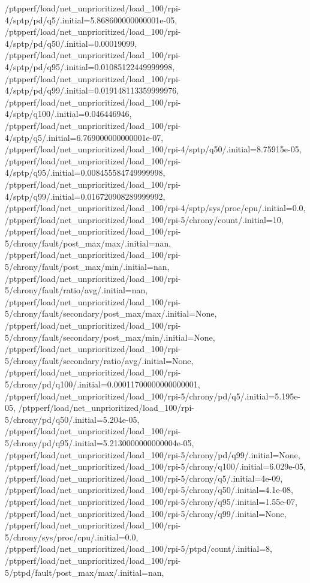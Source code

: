 {    /ptpperf/load/net_unprioritized/load_100/rpi-4/sptp/pd/q5/.initial=5.868600000000001e-05,
    /ptpperf/load/net_unprioritized/load_100/rpi-4/sptp/pd/q50/.initial=0.00019099,
    /ptpperf/load/net_unprioritized/load_100/rpi-4/sptp/pd/q95/.initial=0.01085122449999998,
    /ptpperf/load/net_unprioritized/load_100/rpi-4/sptp/pd/q99/.initial=0.019148113359999976,
    /ptpperf/load/net_unprioritized/load_100/rpi-4/sptp/q100/.initial=0.046446946,
    /ptpperf/load/net_unprioritized/load_100/rpi-4/sptp/q5/.initial=6.769000000000001e-07,
    /ptpperf/load/net_unprioritized/load_100/rpi-4/sptp/q50/.initial=8.75915e-05,
    /ptpperf/load/net_unprioritized/load_100/rpi-4/sptp/q95/.initial=0.008455584749999998,
    /ptpperf/load/net_unprioritized/load_100/rpi-4/sptp/q99/.initial=0.016720908289999992,
    /ptpperf/load/net_unprioritized/load_100/rpi-4/sptp/sys/proc/cpu/.initial=0.0,
    /ptpperf/load/net_unprioritized/load_100/rpi-5/chrony/count/.initial=10,
    /ptpperf/load/net_unprioritized/load_100/rpi-5/chrony/fault/post_max/max/.initial=nan,
    /ptpperf/load/net_unprioritized/load_100/rpi-5/chrony/fault/post_max/min/.initial=nan,
    /ptpperf/load/net_unprioritized/load_100/rpi-5/chrony/fault/ratio/avg/.initial=nan,
    /ptpperf/load/net_unprioritized/load_100/rpi-5/chrony/fault/secondary/post_max/max/.initial=None,
    /ptpperf/load/net_unprioritized/load_100/rpi-5/chrony/fault/secondary/post_max/min/.initial=None,
    /ptpperf/load/net_unprioritized/load_100/rpi-5/chrony/fault/secondary/ratio/avg/.initial=None,
    /ptpperf/load/net_unprioritized/load_100/rpi-5/chrony/pd/q100/.initial=0.00011700000000000001,
    /ptpperf/load/net_unprioritized/load_100/rpi-5/chrony/pd/q5/.initial=5.195e-05,
    /ptpperf/load/net_unprioritized/load_100/rpi-5/chrony/pd/q50/.initial=5.204e-05,
    /ptpperf/load/net_unprioritized/load_100/rpi-5/chrony/pd/q95/.initial=5.2130000000000004e-05,
    /ptpperf/load/net_unprioritized/load_100/rpi-5/chrony/pd/q99/.initial=None,
    /ptpperf/load/net_unprioritized/load_100/rpi-5/chrony/q100/.initial=6.029e-05,
    /ptpperf/load/net_unprioritized/load_100/rpi-5/chrony/q5/.initial=4e-09,
    /ptpperf/load/net_unprioritized/load_100/rpi-5/chrony/q50/.initial=4.1e-08,
    /ptpperf/load/net_unprioritized/load_100/rpi-5/chrony/q95/.initial=1.55e-07,
    /ptpperf/load/net_unprioritized/load_100/rpi-5/chrony/q99/.initial=None,
    /ptpperf/load/net_unprioritized/load_100/rpi-5/chrony/sys/proc/cpu/.initial=0.0,
    /ptpperf/load/net_unprioritized/load_100/rpi-5/ptpd/count/.initial=8,
    /ptpperf/load/net_unprioritized/load_100/rpi-5/ptpd/fault/post_max/max/.initial=nan,
}
